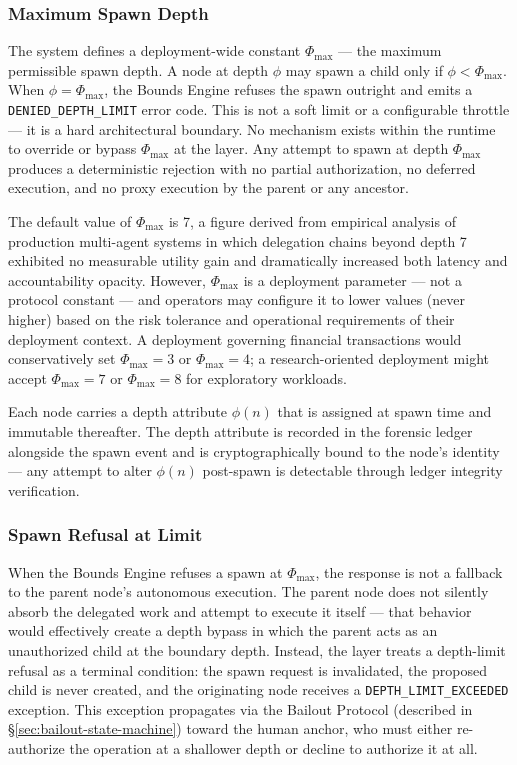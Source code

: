 \subsubsection{Maximum Spawn Depth}\label{sec:max-spawn-depth}

The \bxthree{} system defines a deployment-wide constant $\Phi_{\max}$ — the maximum permissible spawn depth. A node at depth $\phi$ may spawn a child only if $\phi < \Phi_{\max}$. When $\phi = \Phi_{\max}$, the Bounds Engine refuses the spawn outright and emits a \texttt{DENIED\_DEPTH\_LIMIT} error code. This is not a soft limit or a configurable throttle — it is a hard architectural boundary. No mechanism exists within the \bxthree{} runtime to override or bypass $\Phi_{\max}$ at the \bounds{} layer. Any attempt to spawn at depth $\Phi_{\max}$ produces a deterministic rejection with no partial authorization, no deferred execution, and no proxy execution by the parent or any ancestor.

The default value of $\Phi_{\max}$ is 7, a figure derived from empirical analysis of production multi-agent systems in which delegation chains beyond depth 7 exhibited no measurable utility gain and dramatically increased both latency and accountability opacity. However, $\Phi_{\max}$ is a deployment parameter — not a protocol constant — and operators may configure it to lower values (never higher) based on the risk tolerance and operational requirements of their deployment context. A deployment governing financial transactions would conservatively set $\Phi_{\max} = 3$ or $\Phi_{\max} = 4$; a research-oriented deployment might accept $\Phi_{\max} = 7$ or $\Phi_{\max} = 8$ for exploratory workloads.

Each node carries a depth attribute $\phi(n)$ that is assigned at spawn time and immutable thereafter. The depth attribute is recorded in the forensic ledger alongside the spawn event and is cryptographically bound to the node's identity — any attempt to alter $\phi(n)$ post-spawn is detectable through ledger integrity verification.

\subsubsection{Spawn Refusal at Limit}\label{sec:spawn-refusal}

When the Bounds Engine refuses a spawn at $\Phi_{\max}$, the response is not a fallback to the parent node's autonomous execution. The parent node does not silently absorb the delegated work and attempt to execute it itself — that behavior would effectively create a depth bypass in which the parent acts as an unauthorized child at the boundary depth. Instead, the \bounds{} layer treats a depth-limit refusal as a terminal condition: the spawn request is invalidated, the proposed child is never created, and the originating node receives a \texttt{DEPTH\_LIMIT\_EXCEEDED} exception. This exception propagates via the Bailout Protocol (described in \S\ref{sec:bailout-state-machine}) toward the human anchor, who must either re-authorize the operation at a shallower depth or decline to authorize it at all.


